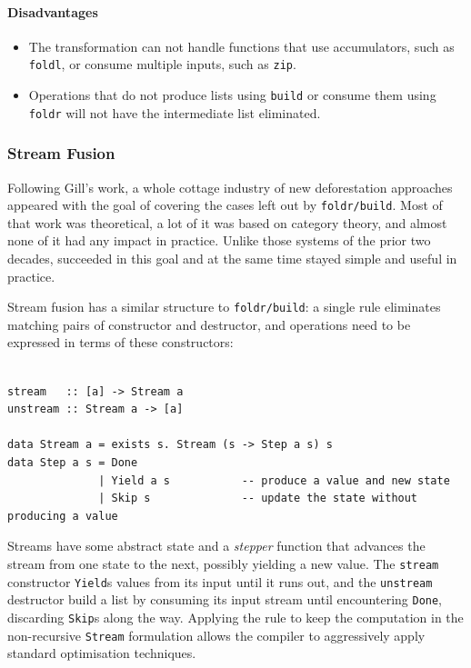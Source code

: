 \paragraph{Disadvantages}
\begin{itemize}
    \item The transformation can not handle functions that use accumulators,
        such as \texttt{foldl}, or consume multiple inputs, such as
        \texttt{zip}.

    \item Operations that do not produce lists using \texttt{build} or consume
        them using \texttt{foldr} will not have the intermediate list
        eliminated.
\end{itemize}


\subsubsection{Stream Fusion}

Following Gill's work, a whole cottage industry of new deforestation approaches
appeared with the goal of covering the cases left out by \texttt{foldr/build}.
Most of that work was theoretical, a lot of it was based on category theory, and
almost none of it had any impact in practice. Unlike those systems of the prior
two decades,  \cite{Coutts:2007} succeeded in this goal and
at the same time stayed simple and useful in practice.

Stream fusion has a similar structure to \texttt{foldr/build}: a single rule
eliminates matching pairs of constructor and destructor, and operations need to
be expressed in terms of these constructors:
%
\begin{lstlisting}[style=Haskell,numbers=none,mathescape,caption={The \emph{stream fusion} transformation}]
%\bf$\langle$ stream fusion $\rangle$% forall s. stream (unstream s) $\mapsto$ s

stream   :: [a] -> Stream a
unstream :: Stream a -> [a]

data Stream a = exists s. Stream (s -> Step a s) s
data Step a s = Done
              | Yield a s           -- produce a value and new state
              | Skip s              -- update the state without producing a value
\end{lstlisting}

Streams have some abstract state and a \emph{stepper} function that advances the
stream from one state to the next, possibly yielding a new value. The
\texttt{stream} constructor \texttt{Yield}s values from its input until it runs
out, and the \texttt{unstream} destructor build a list by consuming its input
stream until encountering \texttt{Done}, discarding \texttt{Skip}s along the
way. Applying the rule to keep the computation in the non-recursive
\texttt{Stream} formulation allows the compiler to aggressively apply standard
optimisation techniques.

